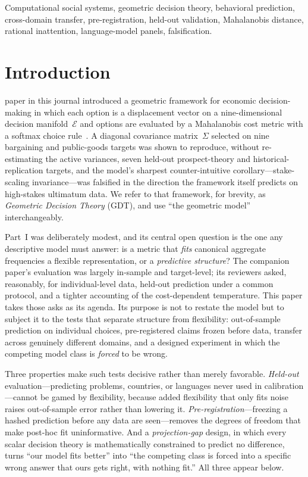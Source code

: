\documentclass[journal]{IEEEtran}
\newcommand{\E}{\mathcal{E}}               %
\begin{document}
\begin{IEEEkeywords}
Computational social systems, geometric decision theory, behavioral prediction, cross-domain transfer, pre-registration, held-out validation, Mahalanobis distance, rational inattention, language-model panels, falsification.
\end{IEEEkeywords}

\section{Introduction}
\label{sec:intro}

 paper in this journal introduced a geometric framework for economic decision-making in which each option is a displacement vector on a nine-dimensional decision manifold~$\E$ and options are evaluated by a Mahalanobis cost metric with a softmax choice rule~\cite{bond2026partI}.
A diagonal covariance matrix~$\Sigma$ selected on nine bargaining and public-goods targets was shown to reproduce, without re-estimating the active variances, seven held-out prospect-theory and historical-replication targets, and the model's sharpest counter-intuitive corollary---stake-scaling invariance---was falsified in the direction the framework itself predicts on high-stakes ultimatum data.
We refer to that framework, for brevity, as \emph{Geometric Decision Theory} (GDT), and use ``the geometric model'' interchangeably.

Part~I was deliberately modest, and its central open question is the one any descriptive model must answer: is a metric that \emph{fits} canonical aggregate frequencies a flexible representation, or a \emph{predictive structure}?
The companion paper's evaluation was largely in-sample and target-level; its reviewers asked, reasonably, for individual-level data, held-out prediction under a common protocol, and a tighter accounting of the cost-dependent temperature.
This paper takes those asks as its agenda.
Its purpose is not to restate the model but to subject it to the tests that separate structure from flexibility: out-of-sample prediction on individual choices, pre-registered claims frozen before data, transfer across genuinely different domains, and a designed experiment in which the competing model class is \emph{forced} to be wrong.

Three properties make such tests decisive rather than merely favorable.
\emph{Held-out} evaluation---predicting problems, countries, or languages never used in calibration---cannot be gamed by flexibility, because added flexibility that only fits noise raises out-of-sample error rather than lowering it.
\emph{Pre-registration}---freezing a hashed prediction before any data are seen---removes the degrees of freedom that make post-hoc fit uninformative.
And a \emph{projection-gap} design, in which every scalar decision theory is mathematically constrained to predict no difference, turns ``our model fits better'' into ``the competing class is forced into a specific wrong answer that ours gets right, with nothing fit.''
All three appear below.
\end{document}
